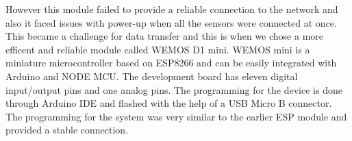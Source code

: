 However this module failed to provide a reliable connection to the network and also it faced issues with power-up when all the sensors were connected at once. This became a challenge for data transfer and this is when we chose a more efficent and reliable module called WEMOS D1 mini. WEMOS mini is a miniature microcontroller based on ESP8266 and can be easily integrated with Arduino and NODE MCU. The development board has eleven digital input/output pins and one analog pins. The programming for the device is done through Arduino IDE and flashed with the help of a USB Micro B connector. The programming for the system was very similar to the earlier ESP module and provided a stable connection.
 
 

